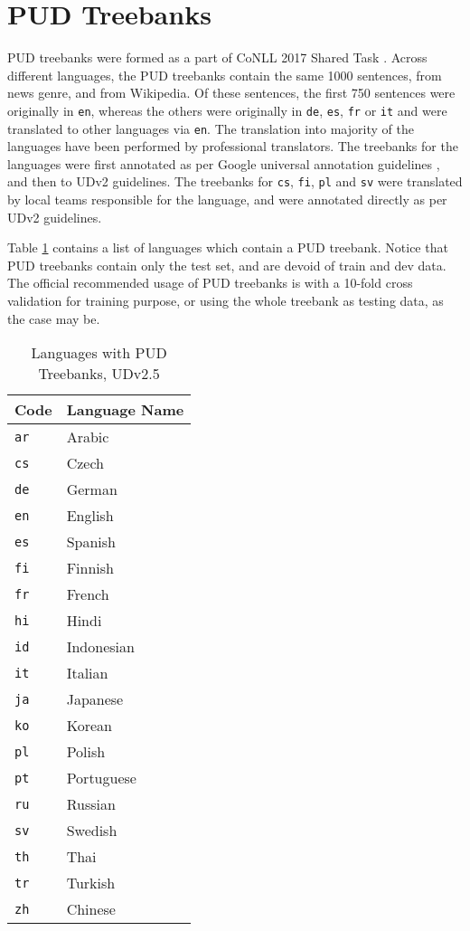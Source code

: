 \newpage

\section{PUD Treebanks}
\label{app:pud}

PUD treebanks were formed as a part of CoNLL 2017 Shared Task \citep{ud-shared-task}. Across different languages, the PUD treebanks contain the same 1000 sentences, from news genre, and from Wikipedia. Of these sentences, the first 750 sentences were originally in \verb|en|, whereas the others were originally in \verb|de|, \verb|es|, \verb|fr| or \verb|it| and were translated to other languages via \verb|en|. The translation into majority of the languages have been performed by professional translators. The treebanks for the languages were first annotated as per Google universal annotation guidelines \cite{google}, and then to UDv2 guidelines. The treebanks for \verb|cs|, \verb|fi|, \texttt{pl} and \verb|sv| were translated by local teams responsible for the language, and were annotated directly as per UDv2 guidelines.

Table \ref{tab:pud} contains a list of languages which contain a PUD treebank. Notice that PUD treebanks contain only the test set, and are devoid of train and dev data. The official recommended usage of PUD treebanks is with a 10-fold cross validation for training purpose, or using the whole treebank as testing data, as the case may be.

\begin{table}[h]
    \centering
    \begin{tabular}{|l|l|}
    \hline
    \textbf{Code} & \textbf{Language Name} \\
    \hline \hline
\texttt{ar} & Arabic \\
\texttt{cs} & Czech \\
\texttt{de} & German \\
\texttt{en} & English \\
\texttt{es} & Spanish \\
\texttt{fi} & Finnish \\
\texttt{fr} & French \\
\texttt{hi} & Hindi \\
\texttt{id} & Indonesian \\
\texttt{it} & Italian \\
\texttt{ja} & Japanese \\
\texttt{ko} & Korean \\
\texttt{pl} & Polish \\
\texttt{pt} & Portuguese \\
\texttt{ru} & Russian \\
\texttt{sv} & Swedish \\
\texttt{th} & Thai \\
\texttt{tr} & Turkish \\
\texttt{zh} & Chinese \\
    \hline
    \end{tabular}
    \caption{Languages with PUD Treebanks, UDv2.5}
    \label{tab:pud}
\end{table}

